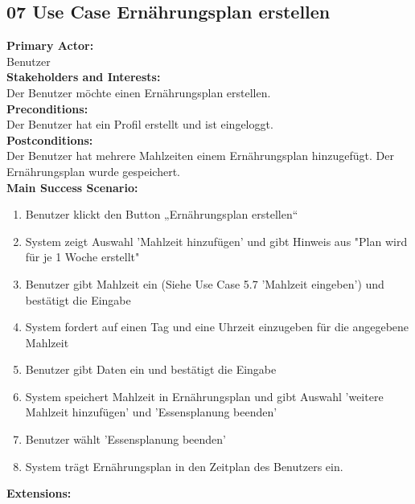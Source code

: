 \documentclass[12pt,a4paper,onecolumn]{article}
\begin{document}
\subsection{07 Use Case Ernährungsplan erstellen}
\textbf{Primary Actor:}\\ Benutzer\\
\textbf{Stakeholders and Interests:}\\
Der Benutzer möchte einen \gls{Ernährungsplan} erstellen.\\
\textbf{Preconditions:} \\ Der Benutzer hat ein Profil erstellt und ist eingeloggt.\\
\textbf{Postconditions:}\\Der Benutzer hat mehrere \gls{Mahlzeit}en einem \gls{Ernährungsplan} hinzugefügt. Der \gls{Ernährungsplan} wurde gespeichert.\\
\textbf{Main Success Scenario:}
\begin{enumerate}
    \item Benutzer klickt den Button „Ernährungsplan erstellen“
    \item System zeigt Auswahl 'Mahlzeit hinzufügen' und gibt Hinweis aus "Plan wird für je 1 Woche erstellt" 
    \item Benutzer gibt \gls{Mahlzeit} ein (Siehe Use Case 5.7 'Mahlzeit eingeben') und bestätigt die Eingabe
    \item System fordert auf einen Tag und eine Uhrzeit einzugeben für die angegebene \gls{Mahlzeit}
    \item Benutzer gibt Daten ein und bestätigt die Eingabe
    \item System speichert \gls{Mahlzeit} in \gls{Ernährungsplan} und gibt Auswahl 'weitere Mahlzeit hinzufügen' und 'Essensplanung beenden'
    \item Benutzer wählt 'Essensplanung beenden'
    \item System trägt Ernährungsplan in den Zeitplan des Benutzers ein.
\end{enumerate}
\textbf{Extensions:}
\end{document}
